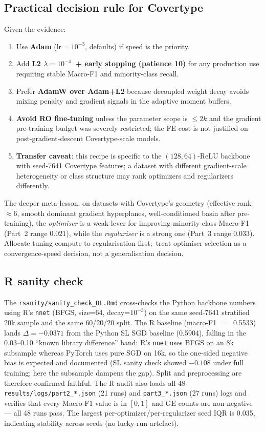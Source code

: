 \documentclass[conference]{IEEEtran}
\begin{document}
\subsection{Practical decision rule for Covertype}\label{sec:disc:rule}
Given the evidence:
\begin{enumerate}[leftmargin=*]
\item Use \textbf{Adam} (lr$=10^{-3}$, defaults) if speed is the priority.
\item Add \textbf{L2 $\lambda{=}10^{-4}$~+ early stopping (patience 10)} for any
production use requiring stable Macro-F1 and minority-class recall.
\item Prefer \textbf{AdamW over Adam+L2} because decoupled weight decay
\cite{loshchilov2019adamw} avoids mixing penalty and gradient signals in the
adaptive moment buffers.
\item \textbf{Avoid RO fine-tuning} unless the parameter scope is $\leq 2k$
and the gradient pre-training budget was severely restricted;
the FE cost is not justified on post-gradient-descent Covertype-scale models.
\item \textbf{Transfer caveat}: this recipe is specific to the
$(128,64)$-ReLU backbone with seed-7641 Covertype features; a dataset with
different gradient-scale heterogeneity or class structure may rank
optimizers and regularizers differently.
\end{enumerate}
\noindent
The deeper meta-lesson: on datasets with Covertype's geometry
(effective rank $\approx 6$, smooth dominant gradient hyperplanes,
well-conditioned basin after pre-training), the \emph{optimiser}
is a weak lever for improving minority-class Macro-F1
(Part~2 range $0.021$), while the \emph{regulariser} is a strong one
(Part~3 range $0.033$).
Allocate tuning compute to regularisation first;\, treat optimiser
selection as a convergence-speed decision, not a generalisation decision.

\subsection{R sanity check}\label{sec:disc:rsanity}
The \texttt{rsanity/sanity\_check\_OL.Rmd} cross-checks the Python backbone
numbers using R's \texttt{nnet} (BFGS, size=64, decay=$10^{-3}$) on the
same seed-7641 stratified 20k sample and the same 60/20/20 split.
The R baseline (macro-F1~$=$~0.5533) lands $\Delta{=}{-}0.0371$ from the
Python SL SGD baseline (0.5904), falling in the 0.03--0.10
``known library difference'' band: R's \texttt{nnet} uses BFGS on an 8k
subsample whereas PyTorch uses pure SGD on 16k, so the one-sided negative
bias is expected and documented (SL sanity check showed $-0.108$ under full
training; here the subsample dampens the gap). Split and preprocessing are
therefore confirmed faithful.
The R audit also loads all 48 \texttt{results/logs/part2\_*.json} (21 runs)
and \texttt{part3\_*.json} (27 runs) logs and verifies that every Macro-F1
value is in $[0,1]$ and GE counts are non-negative --- all 48 runs pass.
The largest per-optimizer/per-regularizer seed IQR is 0.035, indicating
stability across seeds (no lucky-run artefact).
\end{document}
